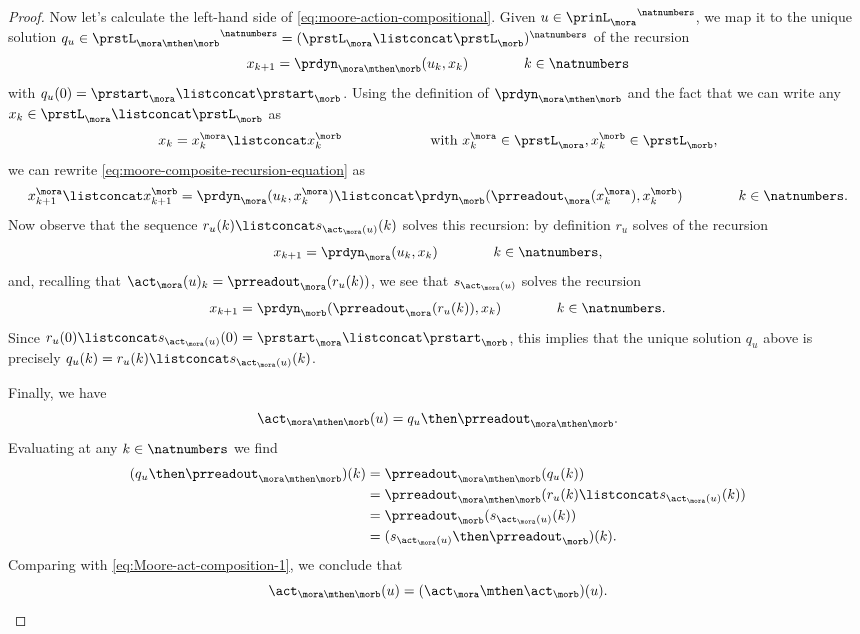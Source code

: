 \begin{proof}
Now let's calculate the left-hand side of \cref{eq:moore-action-compositional}. Given $u \in {\prinL_{\mora}}^\natnumbers$, we map it to the unique solution $q_u \in {\prstL_{\mora \mthen \morb}}^\natnumbers = ({\prstL_{\mora} \listconcat \prstL_{\morb}})^\natnumbers$ of the recursion 
\begin{equation}
\label{eq:moore-composite-recursion-equation}
        x_{k+1} = \prdyn_{\mora \mthen \morb}(u_k, x_k)  \qquad \qquad k \in \natnumbers
\end{equation}
with $q_u(0) = \prstart_{\mora} \listconcat \prstart_{\morb}$. Using the definition of $\prdyn_{\mora \mthen \morb}$ and the fact that we can write any $x_k \in \prstL_{\mora} \listconcat \prstL_{\morb}$ as 
$$x_k = x^\mora_k \listconcat x^\morb_k \qquad \qquad \qquad \text{ with } x^\mora_k \in \prstL_{\mora}, x^\morb_k \in \prstL_{\morb},$$ 
we can rewrite \cref{eq:moore-composite-recursion-equation} as
\begin{equation}
        x^\mora_{k+1} \listconcat x^\morb_{k+1} = \prdyn_{\mora}(u_k, x^\mora_k) \listconcat \prdyn_{\morb}(\prreadout_\mora(x^\mora_k), x^\morb_k)  \qquad \qquad k \in \natnumbers.
\end{equation}
Now observe that the sequence $r_u(k) \listconcat s_{\act_\mora(u)}(k)$ solves this recursion: by definition $r_u$ solves of the recursion
\begin{equation}
        x_{k+1} = \prdyn_\mora(u_k, x_k)  \qquad \qquad k \in \natnumbers,
\end{equation}
and, recalling that $\act_\mora(u)_k = \prreadout_\mora(r_u(k))$, we see that $s_{\act_\mora(u)}$ solves the recursion  
\begin{equation}
        x_{k+1} = \prdyn_\morb(\prreadout_\mora(r_u(k)), x_k)  \qquad \qquad k \in \natnumbers.
\end{equation}
Since $r_u(0) \listconcat s_{\act_\mora(u)}(0) = \prstart_{\mora} \listconcat \prstart_{\morb}$, this implies that the unique solution $q_u$ above is precisely $q_u(k) = r_u(k) \listconcat s_{\act_\mora(u)}(k)$. 

Finally, we have
\begin{equation}
\act_{\mora \mthen \morb}(u) = q_u \then \prreadout_{\mora \mthen \morb}.
\end{equation}
Evaluating at any $k \in \natnumbers$ we find 
\begin{align}
(q_u \then \prreadout_{\mora \mthen \morb})(k) &= \prreadout_{\mora \mthen \morb}(q_u(k)) \\
& = \prreadout_{\mora \mthen \morb}(r_u(k) \listconcat s_{\act_\mora(u)}(k)) \\
&= \prreadout_{\morb}(s_{\act_\mora(u)}(k)) \\
& = (s_{\act_\mora(u)} \then \prreadout_{\morb})(k).
\end{align}
Comparing with \cref{eq:Moore-act-composition-1}, we conclude that 
\begin{equation}
\act_{\mora \mthen \morb}(u) = (\act_\mora \mthen \act_\morb)(u). 
\end{equation}
\end{proof}

